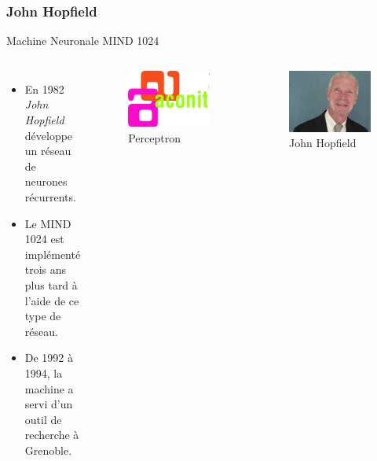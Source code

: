 \documentclass{beamer}
\begin{document}
\subsubsection{John Hopfield}

\begin{frame}{Machine Neuronale MIND 1024}
    \begin{columns}[T]
            \begin{itemize}[<+-| alert@+>] %
                \item En 1982 \textit{John Hopfield} développe un réseau de neurones récurrents.
                \item Le MIND 1024 est implémenté trois ans plus tard à l'aide de ce type de réseau.
                \item De 1992 à 1994, la machine a servi d'un outil de recherche à Grenoble.
            \end{itemize}
            \begin{figure}
                \centering
                \includegraphics[width=0.5\linewidth]{pic/aconit-logo.png}
                \caption{Perceptron}
            \end{figure}
            \begin{figure}
                \centering
                \includegraphics[width=0.55\linewidth]{pic/john-hopfield.jpeg}
                \caption{John Hopfield}
            \end{figure}

\end{columns}
\end{frame}
\end{document}
